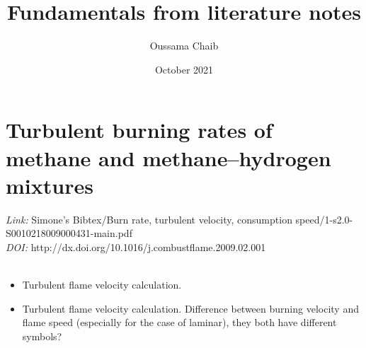 \documentclass[a4paper,11pt]{article}
\title{
	Fundamentals from literature notes
}
\author{\small Oussama Chaib}
\date{\small October 2021}
\begin{document}
	\maketitle
	\tableofcontents
	\pagebreak
	\section{Turbulent burning rates of methane and methane–hydrogen mixtures }
	\textit{Link:} Simone's Bibtex/Burn rate, turbulent velocity, consumption speed/1-s2.0-S0010218009000431-main.pdf\\
	\textit{DOI:} http://dx.doi.org/10.1016/j.combustflame.2009.02.001\\ \\
	
\begin{itemize}
	\item Turbulent flame velocity calculation. 
	\item Turbulent flame velocity calculation. Difference between burning velocity and flame speed (especially for the case of laminar), they both have different symbols?
\end{itemize}

	
	
\end{document}
